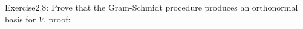 \begin{flushleft}
{\Large Exercise2.8:} Prove that the Gram-Schmidt procedure produces an orthonormal basis for $V$.
\newline
{\large proof:}

\end{flushleft}

